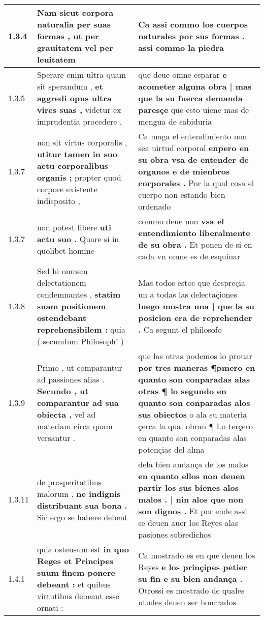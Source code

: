 \begin{tabular}{|p{1cm}|p{6.5cm}|p{6.5cm}|}
1.3.4 & Nam sicut corpora naturalia \textbf{ per suas formas , } ut per grauitatem vel per leuitatem & Ca assi commo los cuerpos naturales \textbf{ por sus formas . } assi commo la piedra \\\hline
1.3.5 & Sperare enim ultra quam sit sperandum , \textbf{ et aggredi opus ultra vires suas , } videtur ex imprudentia procedere , & que deue omne esparar \textbf{ e acometer alguna obra | mas que la su fuerca demanda paresçe } que esto uiene mas de mengua de sabiduria \\\hline
1.3.7 & non sit virtus corporalis , \textbf{ utitur tamen in suo actu corporalibus organis ; } propter quod corpore existente indisposito , & Ca maga el entendimiento non sea uirtud corporal \textbf{ enpero en su obra vsa de entender de organos e de mienbros corporales . } Por la qual cosa el cuerpo non estando bien ordenado \\\hline
1.3.7 & non potest libere \textbf{ uti actu suo . } Quare si in quolibet homine & commo deue non \textbf{ vsa el entendimiento liberalmente de su obra . } Et ponen de si en cada vn omne es de esquiuar \\\hline
1.3.8 & Sed hi omnem delectationem condemnantes , \textbf{ statim suam positionem ostendebant reprehensibilem : } quia ( secundum Philosoph’ ) & Mas todos estos que despreçia un a todas las delectaçiones \textbf{ luego mostra una | que la su posicion era de reprehender . } Ca segunt el philosofo \\\hline
1.3.9 & Primo , ut comparantur ad passiones alias . \textbf{ Secundo , ut comparantur ad sua obiecta , } vel ad materiam circa quam versantur . & que las otras podemos lo prouar \textbf{ por tres maneras ¶pmero en quanto son conparadas alas otras ¶ lo segundo en quanto son conparadas alos sus obiectos } o ala su materia çerca la qual obran ¶ Lo terçero en quanto son conparadas alas potençias del alma \\\hline
1.3.11 & de prosperitatibus malorum , \textbf{ ne indignis distribuant sua bona . } Sic ergo se habere debent & dela bien andança de los malos \textbf{ en quanto ellos non deuen partir los sus bienes alos malos . | nin alos que non son dignos . } Et por ende assi se deuen auer los Reyes alas pasiones sobredichos \\\hline
1.4.1 & quia ostensum est \textbf{ in quo Reges et Principes suum finem ponere debeant : } et quibus virtutibus debeant esse ornati : & Ca mostrado es en que deuen los Reyes \textbf{ e los prinçipes petier su fin e su bien andança . } Otrossi es mostrado de quales utudes deuen ser honrrados \\\hline

\end{tabular}
